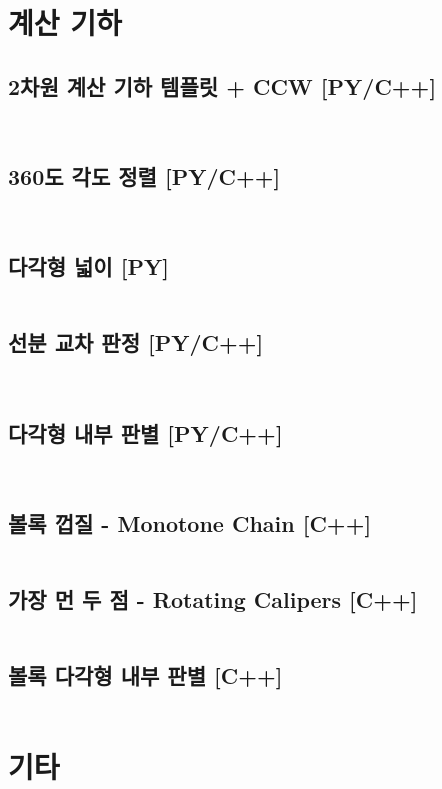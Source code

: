 \documentclass[landscape,8pt,a4paper,twocolumn]{extarticle}
\begin{document}
\section{계산 기하}
\subsection{2차원 계산 기하 템플릿 + CCW [PY/C++]}
\inputminted{python}{python/Geometry/Template.py}
\inputminted{cpp}{mixed/cpp/Geometry/Template.hpp}
\subsection{360도 각도 정렬 [PY/C++]}
\inputminted{python}{python/Geometry/PolarSort.py}
\inputminted{cpp}{mixed/cpp/Geometry/PolarSort.hpp}
\subsection{다각형 넓이 [PY]}
\inputminted{python}{python/Geometry/PolygonArea.py}
\subsection{선분 교차 판정 [PY/C++]}
\inputminted{python}{python/Geometry/SegmentIntersection.py}
\inputminted{cpp}{mixed/cpp/Geometry/SegmentIntersection.hpp}
\subsection{다각형 내부 판별 [PY/C++]}
\inputminted{python}{python/Geometry/PointInPolygon.py}
\inputminted{cpp}{mixed/cpp/Geometry/PointInPolygon.hpp}
\subsection{볼록 껍질 - Monotone Chain [C++]}
\inputminted{cpp}{mixed/cpp/Geometry/ConvexHull.hpp}
\subsection{가장 먼 두 점 - Rotating Calipers [C++]}
\inputminted{cpp}{mixed/cpp/Geometry/Calipers.hpp}
\subsection{볼록 다각형 내부 판별 [C++]}
\inputminted{cpp}{mixed/cpp/Geometry/PointInConvexPolygon.hpp}
\section{기타}
\end{document}

